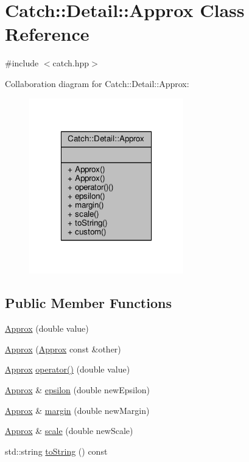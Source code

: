 \hypertarget{class_catch_1_1_detail_1_1_approx}{\section{Catch\-:\-:Detail\-:\-:Approx Class Reference}
\label{class_catch_1_1_detail_1_1_approx}
}


{\ttfamily \#include $<$catch.\-hpp$>$}



Collaboration diagram for Catch\-:\-:Detail\-:\-:Approx\-:
\nopagebreak
\begin{figure}[H]
\begin{center}
\leavevmode
\includegraphics[width=190pt]{class_catch_1_1_detail_1_1_approx__coll__graph}
\end{center}
\end{figure}
\subsection*{Public Member Functions}
\begin{DoxyCompactItemize}
\item 
\hyperlink{class_catch_1_1_detail_1_1_approx_a1a8618ea8db08c66bd3d9fe8f74b957a}{Approx} (double value)
\item 
\hyperlink{class_catch_1_1_detail_1_1_approx_a807330c63266fc914abdf6e461255a54}{Approx} (\hyperlink{class_catch_1_1_detail_1_1_approx}{Approx} const \&other)
\item 
\hyperlink{class_catch_1_1_detail_1_1_approx}{Approx} \hyperlink{class_catch_1_1_detail_1_1_approx_a48c9cbc28a05dc9dc8c3973b9eae2268}{operator()} (double value)
\item 
\hyperlink{class_catch_1_1_detail_1_1_approx}{Approx} \& \hyperlink{class_catch_1_1_detail_1_1_approx_a05c50c3ad0a971fab19345b5d94979a9}{epsilon} (double new\-Epsilon)
\item 
\hyperlink{class_catch_1_1_detail_1_1_approx}{Approx} \& \hyperlink{class_catch_1_1_detail_1_1_approx_a82f7049b41c16e6234275641fad22218}{margin} (double new\-Margin)
\item 
\hyperlink{class_catch_1_1_detail_1_1_approx}{Approx} \& \hyperlink{class_catch_1_1_detail_1_1_approx_acd80f0737bf38112beacd5ca95bef113}{scale} (double new\-Scale)
\item 
std\-::string \hyperlink{class_catch_1_1_detail_1_1_approx_adeb74b73506b3f6b2ba72aea15168fbe}{to\-String} () const 
\end{DoxyCompactItemize}
